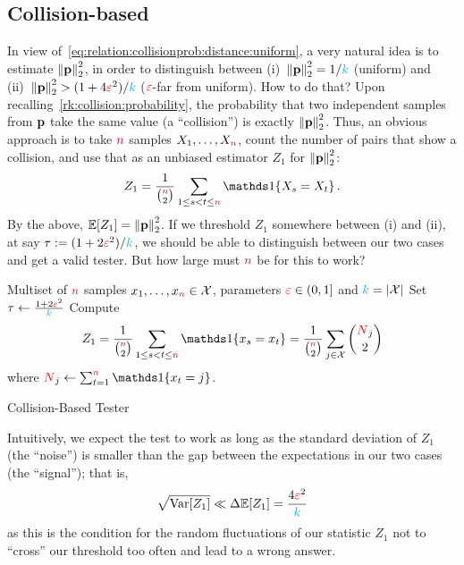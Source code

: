 \subsection{Collision-based}
  \label{sec:uniformity:collision-based}
 In view of~\cref{eq:relation:collisionprob:distance:uniform}, a very natural idea is to estimate $\normtwo{\p}^2$, in order to distinguish between (i)~$\normtwo{\p}^2 = 1/\ab$ (uniform) and (ii)~$\normtwo{\p}^2 > (1+4\dst^2)/\ab$ ($\textcolor{red}{\varepsilon}$-far from uniform). How to do that? Upon recalling~\cref{rk:collision:probability}, the probability that two independent samples from $\mathbf{p}$ take the same value (a ``collision'') is exactly $\normtwo{\p}^2$. Thus, 
an obvious approach is to take ${\textcolor{purple}{n}}$ samples $X_1,\dots,X_{\textcolor{purple}{n}}$, count the number of pairs that show a collision, and use that as an unbiased estimator $Z_1$ for $\normtwo{\p}^2$:
\begin{equation}
  \label{eq:def:z1}
    Z_1 = \frac{1}{\binom{\ns}{2}} \sum_{1\leq s < t \leq \ns} \indic{X_s=X_t}\,.
\end{equation}
By the above, $\expect{Z_1} = \normtwo{\p}^2$. If we threshold $Z_1$ somewhere between (i) and (ii), at say $\tau:= (1+2\textcolor{red}{\varepsilon}^2)/{\textcolor{cyan}{k}}$, we should be able to distinguish between our two cases and get a valid tester. But how large must ${\textcolor{purple}{n}}$ be for this to work? 

\begin{algorithm}[ht!]
  \begin{algorithmic}[1]
    \Require Multiset of ${\textcolor{purple}{n}}$ samples $x_1,\dots,x_{\textcolor{purple}{n}} \in \mathcal{X}$, parameters $\textcolor{red}{\varepsilon}\in(0,1]$ and $\ab = \abs{\domain}$
    \State Set $\tau \gets \frac{1+2\textcolor{red}{\varepsilon}^2}{{\textcolor{cyan}{k}}}$
    \State Compute 
    \[
        Z_1 = \frac{1}{\binom{\ns}{2}} \sum_{1\leq s < t \leq \ns} \indic{x_s=x_t} = \frac{1}{\binom{\ns}{2}} \sum_{j\in\domain} \binom{\occur_j}{2}
    \] where $\occur_j \gets \sum_{t=1}^\ns\indic{x_t=j}$.
     \Return \reject {}
    \Else\ 
      \Return \accept {}
    \EndIf
  \end{algorithmic}
  \caption{\label{algo:collision-based}\sc Collision-Based Tester}
\end{algorithm}

Intuitively, we expect the test to work as long as the standard deviation of $Z_1$ (the ``noise'') is smaller than the gap between the expectations in our two cases (the ``signal''); that is,
\begin{equation}
  \label{eq:signal:to:noise}
      \sqrt{\Var[Z_1]} \ll \Delta \expect{Z_1} = \frac{4\dst^2}{\ab}
\end{equation}
as this is the condition for the random fluctuations of our statistic $Z_1$ not to ``cross'' our threshold too often and lead to a wrong answer.

